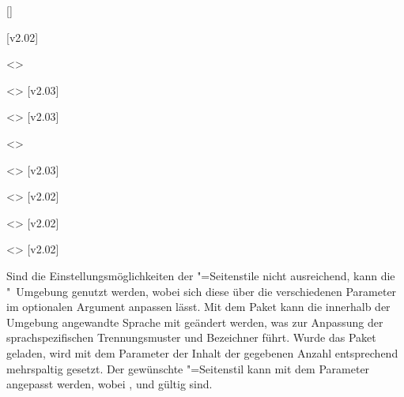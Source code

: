 \begin{DeclareEntity*}{}
\begin{DeclareEntity*}{}
\begin{DeclareEntity*}{}
\begin{Declaration}
  {[]}
\begin{Declaration}
  {}
\begin{Declaration}
  {}
\begin{Declaration}
  {}
  [v2.02]
\begin{Declaration}
  {}
  <>
\begin{Declaration}
  {}
  <>
  [v2.03]
\begin{Declaration}
  {}
  <>
  [v2.03]
\begin{Declaration}
  {}
  <>
\begin{Declaration}
  {}
  <>
  [v2.03]
\begin{Declaration}
  {}
  <>
  [v2.02]
\begin{Declaration}
  {}
  <>
  [v2.02]
\begin{Declaration}
  {}
  <>
  [v2.02]

Sind die Einstellungsmöglichkeiten der "=Seitenstile 
nicht ausreichend, kann die "~Umgebung genutzt werden, 
wobei sich diese über die verschiedenen Parameter im optionalen Argument 
anpassen lässt. Mit dem Paket  kann die innerhalb der Umgebung 
angewandte Sprache mit  
geändert werden, was zur Anpassung der sprachspezifischen Trennungsmuster und 
Bezeichner führt. Wurde das Paket  geladen, wird mit dem 
Parameter  der Inhalt der 
gegebenen Anzahl entsprechend mehrspaltig gesetzt. Der gewünschte  
"=Seitenstil kann mit dem Parameter 
 angepasst werden, 
wobei ,  und  gültig sind. 


\end{Declaration}
\end{Declaration}
\end{Declaration}
\end{Declaration}
\end{Declaration}
\end{Declaration}
\end{Declaration}
\end{Declaration}
\end{Declaration}
\end{Declaration}
\end{Declaration}
\end{Declaration}
\end{DeclareEntity*}
\end{DeclareEntity*}
\end{DeclareEntity*}
